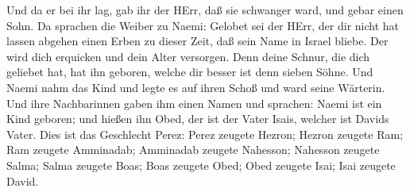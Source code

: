 Und da er bei ihr lag, gab ihr der HErr, daß sie schwanger ward, und
gebar einen Sohn.  Da sprachen die Weiber zu Naemi: Gelobet
sei der HErr, der dir nicht hat lassen abgehen einen Erben zu dieser
Zeit, daß sein Name in Israel bliebe.  Der wird dich
erquicken und dein Alter versorgen. Denn deine Schnur, die dich geliebet
hat, hat ihn geboren, welche dir besser ist denn sieben Söhne.
 Und Naemi nahm das Kind und legte es auf ihren Schoß und
ward seine Wärterin.  Und ihre Nachbarinnen gaben ihm einen
Namen und sprachen: Naemi ist ein Kind geboren; und hießen ihn Obed, der
ist der Vater Isais, welcher ist Davids Vater.  Dies ist
das Geschlecht Perez: Perez zeugete Hezron;  Hezron zeugete
Ram; Ram zeugete Amminadab;  Amminadab zeugete Nahesson;
Nahesson zeugete Salma;  Salma zeugete Boas; Boas zeugete
Obed;  Obed zeugete Isai; Isai zeugete David.
